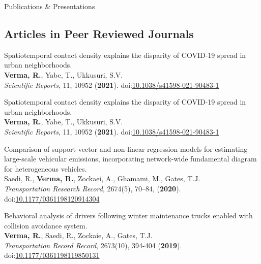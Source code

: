 \documentclass{res} %
\begin{document}
    \begin{rSection}{Publications \& Presentations}
        \subsection*{Articles in Peer Reviewed Journals}
        \begin{etaremune}
            \item Spatiotemporal contact density explains the disparity of COVID-19 spread in urban neighborhoods.
            \\ \textbf{Verma, R.}, Yabe, T., Ukkusuri, S.V.
            \\ \textit{Scientific Reports}, 11, 10952 (\textbf{2021}). doi:\href{https://www.nature.com/articles/s41598-021-90483-1}{10.1038/s41598-021-90483-1}

            \item Spatiotemporal contact density explains the disparity of COVID-19 spread in urban neighborhoods.
            \\ \textbf{Verma, R.}, Yabe, T., Ukkusuri, S.V.
            \\ \textit{Scientific Reports}, 11, 10952 (\textbf{2021}). doi:\href{https://www.nature.com/articles/s41598-021-90483-1}{10.1038/s41598-021-90483-1}

            \item Comparison of support vector and non-linear regression models for estimating large-scale vehicular emissions, incorporating network-wide fundamental diagram for heterogeneous vehicles.
            \\ Saedi, R., \textbf{Verma, R.}, Zockaei, A., Ghamami, M., Gates, T.J.
            \\ \textit{Transportation Research Record}, 2674(5), 70–84, (\textbf{2020}). doi:\href{https://journals.sagepub.com/doi/abs/10.1177/0361198120914304}{10.1177/0361198120914304}

            \item Behavioral analysis of drivers following winter maintenance trucks enabled with collision avoidance system.
            \\ \textbf{Verma, R.}, Saedi, R., Zockaie, A., Gates, T.J.
            \\ \textit{Transportation Record Record}, 2673(10), 394-404 (\textbf{2019}). doi:\href{https://journals.sagepub.com/doi/abs/10.1177/0361198119850131}{10.1177/0361198119850131}
        \end{etaremune}


\end{rSection}
\end{document}
